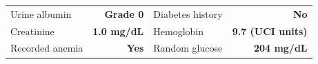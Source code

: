 \begin{tabular*}{\linewidth}{@{\extracolsep{\fill}}lrlr@{}}
Urine albumin & \textbf{Grade 0} & Diabetes history & \textbf{No} \\[0.3ex]
Creatinine & \textbf{1.0 mg/dL} & Hemoglobin & \textbf{9.7 (UCI units)} \\[0.3ex]
Recorded anemia & \textbf{Yes} & Random glucose & \textbf{\color{maroon}204 mg/dL} \\[0.3ex]
\end{tabular*}
